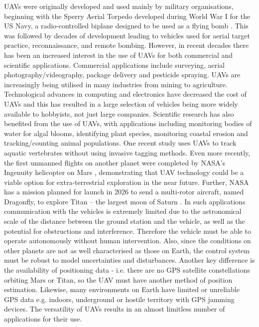 UAVs were originally developed and used mainly by military organisations, beginning with the Sperry Aerial Torpedo developed during World War I for the US Navy, a radio-controlled biplane designed to be used as a flying bomb \cite{Stoff2001}. This was followed by decades of development leading to vehicles used for aerial target practice, reconnaissance, and remote bombing. However, in recent decades there has been an increased interest in the use of UAVs for both commercial and scientific applications. Commercial applications include surveying, aerial photography/videography, package delivery and pesticide spraying. UAVs are increasingly being utilised in many industries from mining to agriculture. Technological advances in computing and electronics have decreased the cost of UAVs and this has resulted in a large selection of vehicles being more widely available to hobbyists, not just large companies. Scientific research has also benefited from the use of UAVs, with applications including monitoring bodies of water for algal blooms, identifying plant species, monitoring coastal erosion and tracking/counting animal populations. One recent study \cite{Raoult2018} uses UAVs to track aquatic vertebrates without using invasive tagging methods. Even more recently, the first unmanned flights on another planet were completed by NASA’s Ingenuity helicopter on Mars \cite{Johnson2021}, demonstrating that UAV technology could be a viable option for extra-terrestrial exploration in the near future. Further, NASA has a mission planned for launch in 2026 to send a multi-rotor aircraft, named Dragonfly, to explore Titan – the largest moon of Saturn \cite{Hautaluoma2019}. In such applications communication with the vehicles is extremely limited due to the astronomical scale of the distance between the ground station and the vehicle, as well as the potential for obstructions and interference. Therefore the vehicle must be able to operate autonomously without human intervention. Also, since the conditions on other planets are not as well characterised as those on Earth, the control system must be robust to model uncertainties and disturbances. Another key difference is the availability of positioning data - i.e. there are no GPS satellite constellations orbiting Mars or Titan, so the UAV must have another method of position estimation. Likewise, many environments on Earth have limited or unreliable GPS data e.g. indoors, underground or hostile territory with GPS jamming devices. The versatility of UAVs results in an almost limitless number of applications for their use.\\


